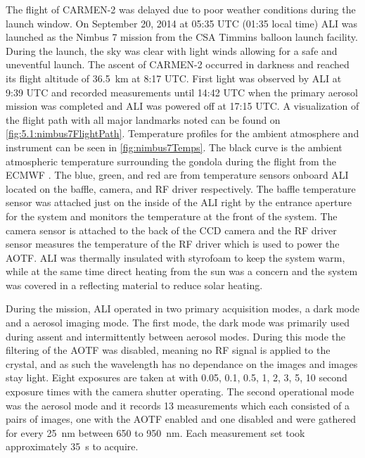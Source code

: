 \documentclass[12pt]{article}
\begin{document}
The flight of CARMEN-2 was delayed due to poor weather conditions during the launch window. On September 20, 2014 at 05:35 UTC (01:35 local time) ALI was launched as the Nimbus 7 mission from the CSA Timmins balloon launch facility. During the launch, the sky was clear with light winds allowing for a safe and uneventful launch. The ascent of CARMEN-2 occurred in darkness and reached its flight altitude of 36.5~km at 8:17 UTC. First light was observed by ALI at 9:39 UTC and recorded measurements until 14:42 UTC when the primary aerosol mission was completed and ALI was powered off at 17:15 UTC. A visualization of the flight path with all major landmarks noted can be found on \autoref{fig:5.1:nimbus7FlightPath}. Temperature profiles for the ambient atmosphere and instrument can be seen in \autoref{fig:nimbus7Temps}. The black curve is the ambient atmospheric temperature surrounding the gondola during the flight from the ECMWF \citep{Molteni1996}. The blue, green, and red are from temperature sensors onboard ALI located on the baffle, camera, and RF driver respectively. The baffle temperature sensor was attached just on the inside of the ALI right by the entrance aperture for the system and monitors the temperature at the front of the system. The camera sensor is attached to the back of the CCD camera and the RF driver sensor measures the temperature of the RF driver which is used to power the AOTF. ALI was thermally insulated with styrofoam to keep the system warm, while at the same time direct heating from the sun was a concern and the system was covered in a reflecting material to reduce solar heating.

During the mission, ALI operated in two primary acquisition modes, a dark mode and a aerosol imaging mode. The first mode, the dark mode was primarily used during assent and intermittently between aerosol modes. During this mode the filtering of the AOTF was disabled, meaning no RF signal is applied to the crystal, and as such the wavelength has no dependance on the images and images stay light. Eight exposures are taken at with 0.05, 0.1, 0.5, 1, 2, 3, 5, 10 second exposure times with the camera shutter operating. The second operational mode was the aerosol mode and it records 13 measurements which each consisted of a pairs of images, one with the AOTF enabled and one disabled and were gathered for every 25~nm between 650 to 950~nm. Each measurement set took approximately 35~s to acquire.
\end{document}
